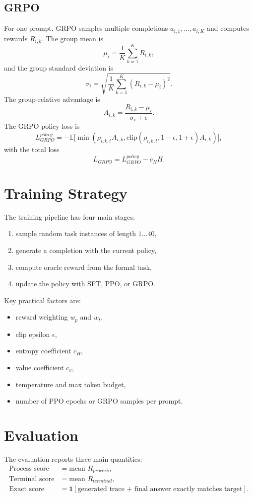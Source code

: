 \documentclass[11pt]{article}
\begin{document}
\subsection{GRPO}
For one prompt, GRPO samples multiple completions $a_{i,1},\dots,a_{i,K}$ and computes rewards $R_{i,k}$.
The group mean is
\[
\mu_i = \frac1K \sum_{k=1}^{K} R_{i,k},
\]
and the group standard deviation is
\[
\sigma_i = \sqrt{\frac1K \sum_{k=1}^{K}(R_{i,k}-\mu_i)^2 }.
\]
The group-relative advantage is
\[
A_{i,k}=\frac{R_{i,k}-\mu_i}{\sigma_i+\epsilon}.
\]
The GRPO policy loss is
\[
L_{GRPO}^{policy}= -\mathbb E\Big[\min(\rho_{i,k,t}A_{i,k},\text{clip}(\rho_{i,k,t},1-\epsilon,1+\epsilon)A_{i,k})\Big],
\]
with the total loss
\[
L_{GRPO}=L_{GRPO}^{policy}-c_H H.
\]

\section{Training Strategy}
The training pipeline has four main stages:
\begin{enumerate}[leftmargin=*]
  \item sample random task instances of length $1\dots 40$,
  \item generate a completion with the current policy,
  \item compute oracle reward from the formal task,
  \item update the policy with SFT, PPO, or GRPO.
\end{enumerate}

Key practical factors are:
\begin{itemize}[leftmargin=*]
  \item reward weighting $w_p$ and $w_t$,
  \item clip epsilon $\epsilon$,
  \item entropy coefficient $c_H$,
  \item value coefficient $c_v$,
  \item temperature and max token budget,
  \item number of PPO epochs or GRPO samples per prompt.
\end{itemize}

\section{Evaluation}
The evaluation reports three main quantities:
\begin{align*}
\text{Process score} &= \text{mean } R_{process},\\
\text{Terminal score} &= \text{mean } R_{terminal},\\
\text{Exact score} &= \mathbf{1}[\text{generated trace + final answer exactly matches target}].
\end{align*}
\end{document}

